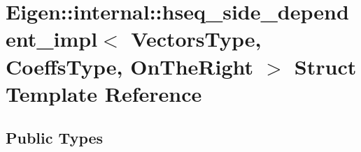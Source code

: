 \hypertarget{struct_eigen_1_1internal_1_1hseq__side__dependent__impl_3_01_vectors_type_00_01_coeffs_type_00_01_on_the_right_01_4}{}\section{Eigen\+:\+:internal\+:\+:hseq\+\_\+side\+\_\+dependent\+\_\+impl$<$ Vectors\+Type, Coeffs\+Type, On\+The\+Right $>$ Struct Template Reference}
\label{struct_eigen_1_1internal_1_1hseq__side__dependent__impl_3_01_vectors_type_00_01_coeffs_type_00_01_on_the_right_01_4}
\subsection*{Public Types}
